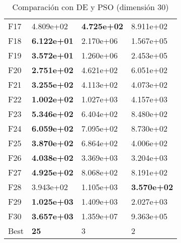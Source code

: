 \documentclass[10pt,a4paper]{article}
\begin{document}
\begin{table}[]
\begin{tabular}{|l|l|l|l|}
		F17  &  4.809e+02 &  \textbf{4.725e+02} &  8.911e+02 \\
		F18  &  \textbf{6.122e+01} &  2.170e+06 &  1.567e+05 \\
		F19  &  \textbf{3.572e+01} &  1.260e+06 &  2.453e+05 \\
		F20  &  \textbf{2.751e+02} &  4.621e+02 &  6.051e+02 \\
		F21  &  \textbf{3.255e+02} &  4.113e+02 &  4.073e+02 \\
		F22  &  \textbf{1.002e+02} &  1.027e+03 &  4.157e+03 \\
		F23  &  \textbf{5.346e+02} &  6.404e+02 &  8.480e+02 \\
		F24  &  \textbf{6.059e+02} &  7.095e+02 &  8.730e+02 \\
		F25  &  \textbf{3.870e+02} &  6.864e+02 &  4.006e+02 \\
		F26  &  \textbf{4.038e+02} &  3.369e+03 &  3.204e+03 \\
		F27  &  \textbf{4.925e+02} &  8.068e+02 &  8.191e+02 \\
		F28  &  3.943e+02 &  1.105e+03 &  \textbf{3.570e+02} \\
		F29  &  \textbf{1.025e+03} &  1.409e+03 &  2.027e+03 \\
		F30  &  \textbf{3.657e+03} &  1.359e+07 &  9.363e+05 \\ \hline
		Best &         \textbf{25} &          3 &          2 \\ \hline
	\end{tabular}
	\caption{Comparación con DE y PSO (dimensión 30)}
	\label{table:mimh1_dim30}
\end{table}
\end{document}
